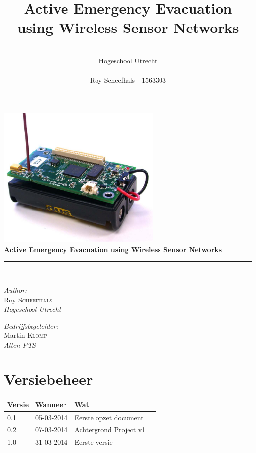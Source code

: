 \documentclass{../local}
\title{\textbf{Active Emergency Evacuation using Wireless Sensor Networks}}
\author{\\
		Hogeschool Utrecht\\
		\\
		Roy Scheefhals - 1563303}
\begin{document}
\begin{titlepage}
\begin{center}

\includegraphics[width=0.6\textwidth]{mica2}~\\[1cm]

{ \huge \bfseries Active Emergency Evacuation using Wireless Sensor Networks \\[0.4cm] }
\hrule
\hspace{0pt} \\[1.3cm]

\begin{minipage}{0.4\textwidth}
\begin{flushleft} \large
\emph{Author:}\\
Roy \textsc{Scheefhals}\\
\emph{Hogeschool Utrecht}
\end{flushleft}
\end{minipage}
\begin{minipage}{0.4\textwidth}
\begin{flushright} \large
\emph{Bedrijfsbegeleider:} \\
Martin \textsc{Klomp}\\
\emph{Alten PTS}
\end{flushright}
\end{minipage}

\end{center}
\end{titlepage}

\newpage

\renewcommand{\thesection}{\Roman{section}}

\section*{Versiebeheer}
\begin{tabular}{ | l | l | l | p{7.5cm} |}
\hline
Versie & Wanneer & Wat \\ \hline
0.1 & 05-03-2014 & Eerste opzet document\\ \hline
0.2 & 07-03-2014 & Achtergrond Project v1\\ \hline
1.0 & 31-03-2014 & Eerste versie\\ \hline

\end{tabular}
\end{document}
